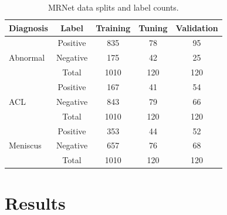 \documentclass[10pt,twocolumn,letterpaper]{article}
\begin{document}
\begin{table}
\begin{center}
\begin{tabular}{|lc|c|c|c|}
\hline
Diagnosis & Label & Training & Tuning & Validation \\
\hline
\multirow{ 3}{*}{Abnormal} & Positive & 835 & 78 & 95 \\
                           & Negative & 175 & 42 & 25 \\
                           & Total & 1010 & 120 & 120 \\
\hline
\multirow{ 3}{*}{ACL}      & Positive & 167 & 41 & 54 \\
                           & Negative & 843 & 79 & 66 \\
                           & Total & 1010 & 120 & 120 \\
\hline
\multirow{ 3}{*}{Meniscus} & Positive & 353 & 44 & 52 \\
                           & Negative & 657 & 76 & 68 \\
                           & Total & 1010 & 120 & 120 \\
\hline
\end{tabular}
\end{center}
\caption{MRNet data splits and label counts.}
\label{tab:dataset}
\end{table}

\section{Results} %

\end{document}
